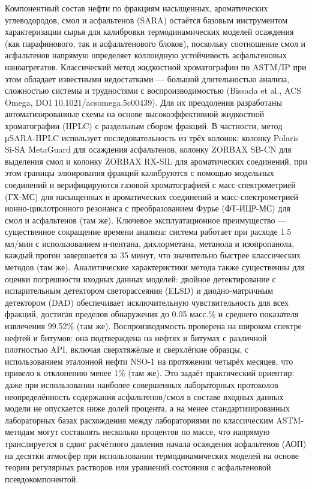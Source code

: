 \documentclass[11pt]{extarticle}
\begin{document}
Компонентный состав нефти по фракциям насыщенных, ароматических углеводородов, смол и асфальтенов (SARA) остаётся базовым инструментом характеризации сырья для калибровки термодинамических моделей осаждения (как парафинового, так и асфальтенового блоков), поскольку соотношение смол и асфальтенов напрямую определяет коллоидную устойчивость асфальтеновых наноагрегатов. Классический метод жидкостной хроматографии по ASTM/IP при этом обладает известными недостатками --- большой длительностью анализа, сложностью системы и трудностями с воспроизводимостью (Bissada et al., ACS Omega, DOI 10.1021/acsomega.5c00439). Для их преодоления разработаны автоматизированные схемы на основе высокоэффективной жидкостной хроматографии (HPLC) с раздельным сбором фракций. В частности, метод μSARA-HPLC использует последовательность из трёх колонок: колонку Polaris Si-SA MetaGuard для осаждения асфальтенов, колонку ZORBAX SB-CN для выделения смол и колонку ZORBAX RX-SIL для ароматических соединений, при этом границы элюирования фракций калибруются с помощью модельных соединений и верифицируются газовой хроматографией с масс-спектрометрией (ГХ-МС) для насыщенных и ароматических соединений и масс-спектрометрией ионно-циклотронного резонанса с преобразованием Фурье (ФТ-ИЦР-МС) для смол и асфальтенов (там же). Ключевое эксплуатационное преимущество --- существенное сокращение времени анализа: система работает при расходе 1.5 мл/мин с использованием н-пентана, дихлорметана, метанола и изопропанола, каждый прогон завершается за 35 минут, что значительно быстрее классических методов (там же). Аналитические характеристики метода также существенны для оценки погрешности входных данных моделей: двойное детектирование с испарительным детектором светорассеяния (ELSD) и диодно-матричным детектором (DAD) обеспечивает исключительную чувствительность для всех фракций, достигая пределов обнаружения до 0.05 масс.\% и среднего показателя извлечения 99.52\% (там же). Воспроизводимость проверена на широком спектре нефтей и битумов: она подтверждена на нефтях и битумах с различной плотностью API, включая сверхтяжёлые и сверхлёгкие образцы, с использованием эталонной нефти NSO-1 на протяжении четырёх месяцев, что привело к отклонению менее 1\% (там же). Это задаёт практический ориентир: даже при использовании наиболее совершенных лабораторных протоколов неопределённость содержания асфальтенов/смол в составе входных данных модели не опускается ниже долей процента, а на менее стандартизированных лабораторных базах расхождения между лабораториями по классическим ASTM-методам могут составлять несколько процентов по массе, что напрямую транслируется в сдвиг расчётного давления начала осаждения асфальтенов (АОП) на десятки атмосфер при использовании термодинамических моделей на основе теории регулярных растворов или уравнений состояния с асфальтеновой псевдокомпонентой.
\end{document}

